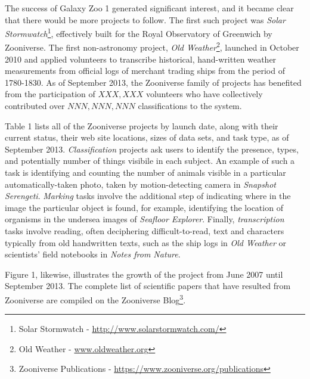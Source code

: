 \documentclass{sigchi}
\begin{document}
The success of Galaxy Zoo 1 generated significant interest, and it became clear that there would be more projects to follow.  The first such project was \emph{Solar Stormwatch}\footnote{Solar Stormwatch - \url{http://www.solarstormwatch.com/}}, effectively built for the Royal Observatory of Greenwich by Zooniverse.  The first non-astronomy project, \emph{Old Weather}\footnote{Old Weather - \url{www.oldweather.org}}, launched in October 2010 and applied volunteers to transcribe historical, hand-written weather measurements from official logs of merchant trading ships from the period of 1780-1830.  As of September 2013, the Zooniverse family of projects has benefited from the participation of $XXX,XXX$ volunteers who have collectively contributed over $NNN,NNN,NNN$ classifications to the system.  

Table 1 lists all of the Zooniverse projects by launch date, along with their current status, their web site locations, sizes of data sets, and task type, as of September 2013.  \emph{Classification} projects ask users to identify the presence, types, and potentially number of things visibile in each subject.  An example of such a task is identifying and counting the number of animals visible in a particular automatically-taken photo, taken by motion-detecting camera in \emph{Snapshot Serengeti}. \emph{Marking} tasks involve the additional step of indicating where in the image the particular object is found, for example, identifying the location of organisms in the undersea images of \emph{Seafloor Explorer}.  Finally, \emph{transcription} tasks involve reading, often deciphering difficult-to-read, text and characters typically from old handwritten texts, such as the ship logs in \emph{Old Weather} or scientists' field notebooks in \emph{Notes from Nature}.    

Figure 1, likewise, illustrates the growth of the project from June 2007 until September 2013. The complete list of scientific papers that have resulted from Zooniverse are compiled on the Zooniverse Blog\footnote{Zooniverse Publications - \url{https://www.zooniverse.org/publications}}.
\end{document}
